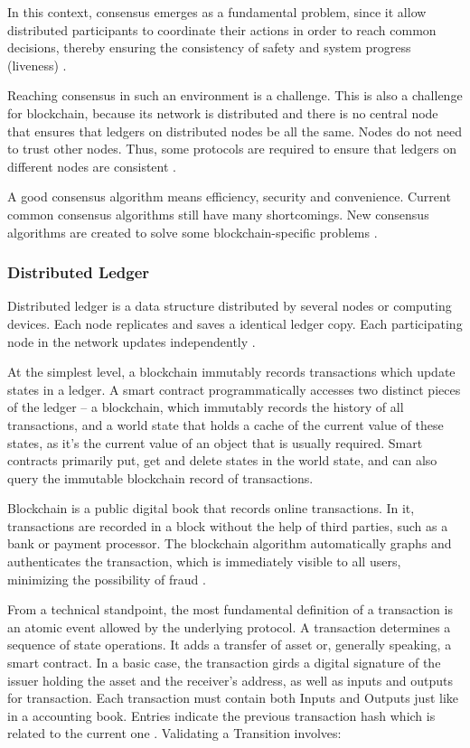 In this context, consensus emerges as a fundamental problem, since it allow distributed participants to coordinate their actions in order to reach common decisions, thereby ensuring the consistency of safety and system progress (liveness) \cite{greve2018blockchain}.

Reaching consensus in such an environment is a challenge. This is also a challenge for blockchain, because its network is distributed and there is no central node that ensures that ledgers on distributed nodes be all the same. Nodes do not need to trust other nodes. Thus, some protocols are required to ensure that ledgers on different nodes are consistent \cite{kostarev2017review}.

A good consensus algorithm means efficiency, security and convenience. Current common consensus algorithms still have many shortcomings. New consensus algorithms are created to solve some blockchain-specific problems \cite{zheng2016blockchain}.

\subsubsection{Distributed Ledger}\label{sec:livro}
Distributed ledger is a data structure distributed by several nodes or computing devices. Each node replicates and saves a identical ledger copy. Each participating node in the network updates independently \cite{greve2018blockchain}.

At the simplest level, a blockchain immutably records transactions which update states in a ledger. A smart contract programmatically accesses two distinct pieces of the ledger – a blockchain, which immutably records the history of all transactions, and a world state that holds a cache of the current value of these states, as it’s the current value of an object that is usually required. Smart contracts primarily put, get and delete states in the world state, and can also query the immutable blockchain record of transactions.

\label{sec:transac}
Blockchain is a public digital book that records online transactions. In it, transactions are recorded in a block without the help of third parties, such as a bank or payment processor. The blockchain algorithm automatically graphs and authenticates the transaction, which is immediately visible to all users, minimizing the possibility of fraud \cite{Bankrate2018}.

From a technical standpoint, the most fundamental definition of a transaction is an atomic event allowed by the underlying protocol. A transaction determines a sequence of state operations. It adds a transfer of asset or, generally speaking, a smart contract. In a basic case, the transaction girds a digital signature of the issuer holding the asset and the receiver's address, as well as inputs and outputs for transaction. Each transaction must contain both Inputs and Outputs just like in a accounting book. Entries indicate the previous transaction hash which is related to the current one \cite{greve2018blockchain}. Validating a Transition involves:

